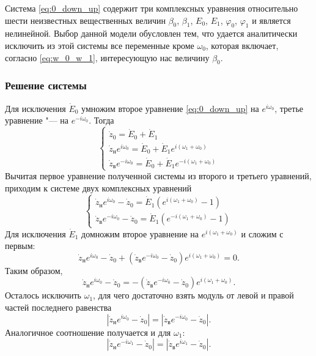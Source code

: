 \documentclass[../main.tex]{subfiles}
\begin{document}
Система \eqref{eq:0_down_up} содержит три комплексных уравнения относительно шести неизвестных вещественных величин $\beta_0$, $\beta_1$, $E_0$, $E_1$, $\varphi_0$, $\varphi_1$ и является нелинейной. Выбор данной модели обусловлен тем, что удается аналитически исключить из этой системы все переменные кроме $\omega_0$, которая включает, согласно \eqref{eq:w_0_w_1}, интересующую нас величину $\beta_0$.

\subsubsection{Решение системы}
Для исключения $\dot{E}_0$ умножим второе уравнение \eqref{eq:0_down_up} на $e^{i\omega_0}$, третье уравнение "--- на $e^{-i\omega_0}$. Тогда
\begin{equation*}
  \begin{cases}
    \dot{z}_0 = \dot{E}_0 + \dot{E}_1 \\
    \dot{z}_\text{н} e^{ i\omega_0} = \dot{E}_0 + \dot{E}_1 e^{ i \left(\omega_1 + \omega_0 \right)} \\
    \dot{z}_\text{в} e^{-i\omega_0} = \dot{E}_0 + \dot{E}_1 e^{-i \left(\omega_1 + \omega_0\right)}
  \end{cases}
\end{equation*}
Вычитая первое уравнение полученной системы из второго и третьего уравнений, приходим к системе двух комплексных уравнений
\begin{equation*}
  \begin{cases}
    \dot{z}_\text{н} e^{ i\omega_0} - \dot{z}_0 = \dot{E}_1 \left( e^{ i\left(\omega_1 + \omega_0 \right)} - 1\right) \\
    \dot{z}_\text{в} e^{-i\omega_0} - \dot{z}_0 = \dot{E}_1 \left( e^{-i\left(\omega_1 + \omega_0 \right)} - 1 \right)
  \end{cases}
\end{equation*}
Для исключения $\dot{E}_1$ домножим второе уравнение на $e^{i \left(\omega_1 + \omega_0 \right)}$ и сложим с первым:
\begin{equation*}
  \dot{z}_\text{н} e^{i\omega_0} - \dot{z}_0 + \left(\dot{z}_\text{в} e^{-i\omega_0} - \dot{z}_0 \right) e^{i \left(\omega_1 + \omega_0 \right)} = 0.
\end{equation*}
Таким образом,
\begin{equation*}
  \dot{z}_\text{н} e^{i\omega_0} - \dot{z}_0 = -\left(\dot{z}_\text{в} e^{-i\omega_0} - \dot{z}_0 \right) e^{i\left(\omega_1+\omega_0\right)}.
\end{equation*}
Осталось исключить $\omega_1$, для чего достаточно взять модуль от левой и правой частей последнего равенства
\begin{equation} \label{eq:w_0}
  \left|\dot{z}_\text{н} e^{i\omega_0} - \dot{z}_0 \right| = \left|\dot{z}_\text{в} e^{-i\omega_0} - \dot{z}_0\right|.
\end{equation}
Аналогичное соотношение получается и для $\omega_1$:
\begin{equation} \label{eq:w_1}
  \left|\dot{z}_\text{н} e^{-i\omega_1} - \dot{z}_0 \right| = \left|\dot{z}_\text{в} e^{i\omega_1} - \dot{z}_0 \right|.
\end{equation}
\end{document}
